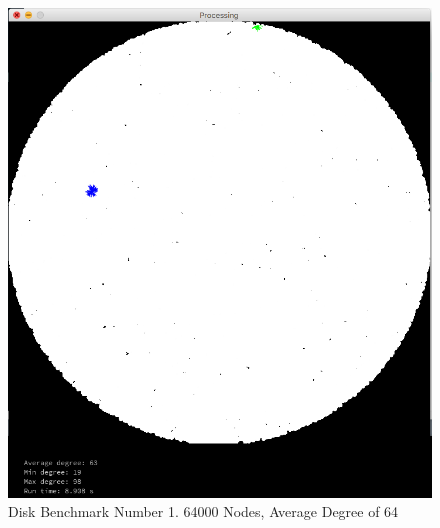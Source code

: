 \documentclass{article}
\begin{document}
\begin{center}
    \begin{figure}
        \includegraphics[scale=0.45]{./images/disk_1.png}
        \caption{Disk Benchmark Number 1. 64000 Nodes, Average Degree of 64}
        \label{disk1}
    \end{figure}
\end{center}
\end{document}
